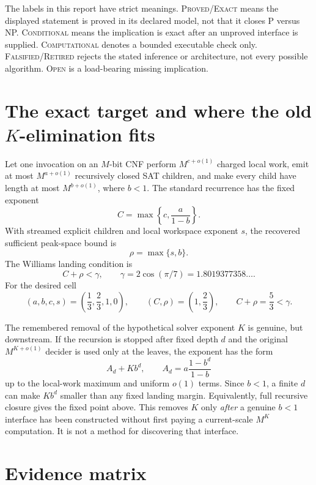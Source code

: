 \documentclass[10pt]{article}
\newcommand{\Exact}{\textsc{Proved/Exact}}
\newcommand{\Conditional}{\textsc{Conditional}}
\newcommand{\Computational}{\textsc{Computational}}
\newcommand{\Falsified}{\textsc{Falsified/Retired}}
\newcommand{\Open}{\textsc{Open}}
\begin{document}
The labels in this report have strict meanings.  \Exact{} means the displayed
statement is proved in its declared model, not that it closes P versus NP.
\Conditional{} means the implication is exact after an unproved interface is
supplied.  \Computational{} denotes a bounded executable check only.
\Falsified{} rejects the stated inference or architecture, not every possible
algorithm.  \Open{} is a load-bearing missing implication.

\section{The exact target and where the old \texorpdfstring{$K$}{K}-elimination fits}

Let one invocation on an $M$-bit CNF perform $M^{c+o(1)}$ charged local work,
emit at most $M^{a+o(1)}$ recursively closed SAT children, and make every
child have length at most $M^{b+o(1)}$, where $b<1$.  The standard recurrence
has the fixed exponent
\[
 C=\max\left\{c,\frac{a}{1-b}\right\}.
\]
With streamed explicit children and local workspace exponent $s$, the
recovered sufficient peak-space bound is
\[
 \rho=\max\{s,b\}.
\]
The Williams landing condition is
\[
 C+\rho<\gamma,
 \qquad \gamma=2\cos(\pi/7)=1.8019377358\ldots.
\]
For the desired cell
\[
 (a,b,c,s)=\left(\frac13,\frac23,1,0\right),
 \qquad (C,\rho)=\left(1,\frac23\right),
 \qquad C+\rho=\frac53<\gamma.
\]

The remembered removal of the hypothetical solver exponent $K$ is genuine,
but downstream.  If the recursion is stopped after fixed depth $d$ and the
original $M^{K+o(1)}$ decider is used only at the leaves, the exponent has the
form
\[
 A_d+K b^d,
 \qquad
 A_d=a\frac{1-b^d}{1-b}
\]
up to the local-work maximum and uniform $o(1)$ terms.  Since $b<1$, a finite
$d$ can make $Kb^d$ smaller than any fixed landing margin.  Equivalently,
full recursive closure gives the fixed point above.  This removes $K$ only
\emph{after} a genuine $b<1$ interface has been constructed without first
paying a current-scale $M^K$ computation.  It is not a method for discovering
that interface.

\section{Evidence matrix}
\end{document}
